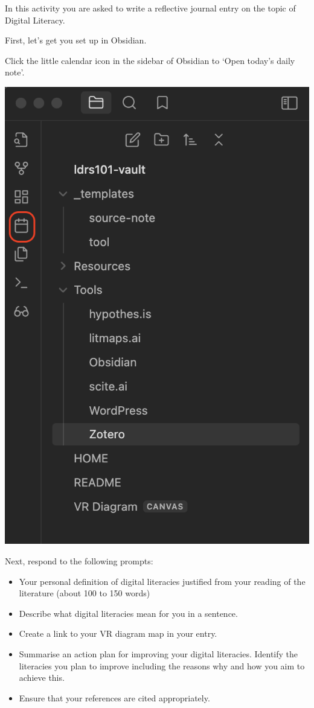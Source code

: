 \documentclass[
]{book}
\providecommand{\tightlist}{%
  \setlength{\itemsep}{0pt}\setlength{\parskip}{0pt}}
\theoremstyle{definition}
\theoremstyle{definition}
\theoremstyle{definition}
\theoremstyle{definition}
\theoremstyle{remark}
\begin{document}
\begin{reflect}
In this activity you are asked to write a reflective journal entry on the topic of Digital Literacy.

First, let's get you set up in Obsidian.

Click the little calendar icon in the sidebar of Obsidian to `Open today's daily note'.

\includegraphics{assets/u1/obsidian1.png}

Next, respond to the following prompts:

\begin{itemize}
\tightlist
\item
  Your personal definition of digital literacies justified from your reading of the literature (about 100 to 150 words)
\item
  Describe what digital literacies mean for you in a sentence.
\item
  Create a link to your VR diagram map in your entry.
\item
  Summarise an action plan for improving your digital literacies. Identify the literacies you plan to improve including the reasons why and how you aim to achieve this.
\item
  Ensure that your references are cited appropriately.
\end{itemize}
\end{reflect}
\end{document}
